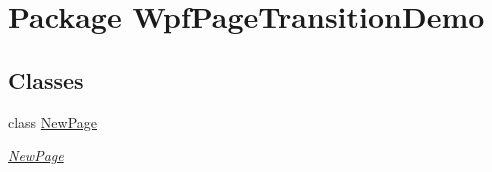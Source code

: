 \hypertarget{namespace_wpf_page_transition_demo}{\section{Package Wpf\+Page\+Transition\+Demo}
\label{namespace_wpf_page_transition_demo}
}
\subsection*{Classes}
\begin{DoxyCompactItemize}
\item 
class \hyperlink{class_wpf_page_transition_demo_1_1_new_page}{New\+Page}
\begin{DoxyCompactList}\small\item\em \hyperlink{class_wpf_page_transition_demo_1_1_new_page}{New\+Page} \end{DoxyCompactList}\end{DoxyCompactItemize}
